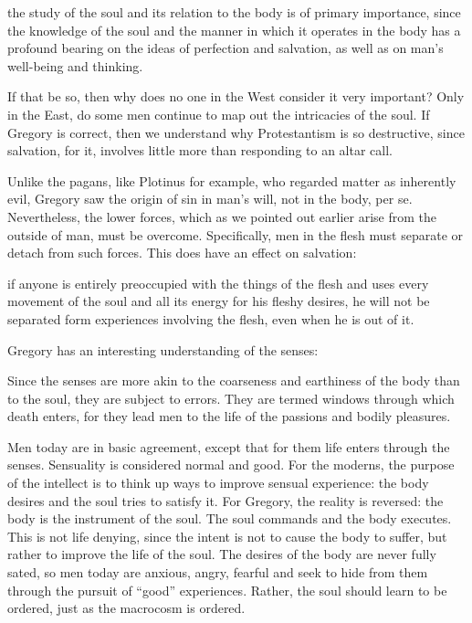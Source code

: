 \begin{quotex}
the study of the soul and its relation to the body is of primary importance, since the knowledge of the soul and the manner in which it operates in the body has a profound bearing on the ideas of perfection and salvation, as well as on man's well-being and thinking. 

\end{quotex}
If that be so, then why does no one in the West consider it very important? Only in the East, do some men continue to map out the intricacies of the soul. If Gregory is correct, then we understand why Protestantism is so destructive, since salvation, for it, involves little more than responding to an altar call.

Unlike the pagans, like Plotinus for example, who regarded matter as inherently evil, Gregory saw the origin of sin in man's will, not in the body, per se. Nevertheless, the lower forces, which as we pointed out earlier arise from the outside of man, must be overcome. Specifically, men in the flesh must separate or detach from such forces. This does have an effect on salvation:

\begin{quotex}
if anyone is entirely preoccupied with the things of the flesh and uses every movement of the soul and all its energy for his fleshy desires, he will not be separated form experiences involving the flesh, even when he is out of it. 

\end{quotex}
Gregory has an interesting understanding of the senses:

\begin{quotex}
Since the senses are more akin to the coarseness and earthiness of the body than to the soul, they are subject to errors. They are termed windows through which death enters, for they lead men to the life of the passions and bodily pleasures. 

\end{quotex}
Men today are in basic agreement, except that for them life enters through the senses. Sensuality is considered normal and good. For the moderns, the purpose of the intellect is to think up ways to improve sensual experience: the body desires and the soul tries to satisfy it. For Gregory, the reality is reversed: the body is the instrument of the soul. The soul commands and the body executes. This is not life denying, since the intent is not to cause the body to suffer, but rather to improve the life of the soul. The desires of the body are never fully sated, so men today are anxious, angry, fearful and seek to hide from them through the pursuit of “good” experiences. Rather, the soul should learn to be ordered, just as the macrocosm is ordered.

